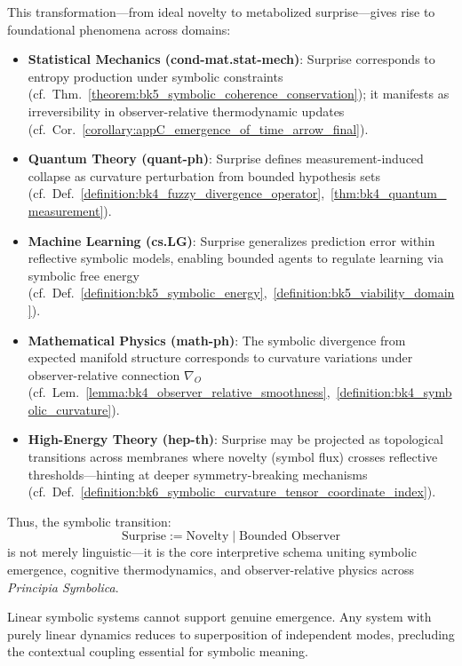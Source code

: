 \begin{tcolorbox}[colback=blue!5!white, colframe=blue!75!black, title=From Novelty to Surprise: The Operational Definition for Observer-Framed Divergence]
This transformation—from ideal novelty to metabolized surprise—gives rise to foundational phenomena across domains:
\begin{itemize}
    \item \textbf{Statistical Mechanics (cond-mat.stat-mech)}: Surprise corresponds to entropy production under symbolic constraints (cf.~Thm.~\ref{theorem:bk5_symbolic_coherence_conservation}); it manifests as irreversibility in observer-relative thermodynamic updates (cf.~Cor.~\ref{corollary:appC_emergence_of_time_arrow_final}).
    \item \textbf{Quantum Theory (quant-ph)}: Surprise defines measurement-induced collapse as curvature perturbation from bounded hypothesis sets (cf.~Def.~\ref{definition:bk4_fuzzy_divergence_operator},~\ref{thm:bk4_quantum_measurement}).
    \item \textbf{Machine Learning (cs.LG)}: Surprise generalizes prediction error within reflective symbolic models, enabling bounded agents to regulate learning via symbolic free energy (cf.~Def.~\ref{definition:bk5_symbolic_energy},~\ref{definition:bk5_viability_domain}).
    \item \textbf{Mathematical Physics (math-ph)}: The symbolic divergence from expected manifold structure corresponds to curvature variations under observer-relative connection $\nabla_O$ (cf.~Lem.~\ref{lemma:bk4_observer_relative_smoothness},~\ref{definition:bk4_symbolic_curvature}).
    \item \textbf{High-Energy Theory (hep-th)}: Surprise may be projected as topological transitions across membranes where novelty (symbol flux) crosses reflective thresholds—hinting at deeper symmetry-breaking mechanisms (cf.~Def.~\ref{definition:bk6_symbolic_curvature_tensor_coordinate_index}).
\end{itemize}

Thus, the symbolic transition:
\[
\boxed{\text{Surprise} := \text{Novelty} \mid \text{Bounded Observer}}
\]
is not merely linguistic—it is the core interpretive schema uniting symbolic emergence, cognitive thermodynamics, and observer-relative physics across \textit{Principia Symbolica}.
\end{tcolorbox}



\begin{corollary}
\label{corollary:bk1_linear_insufficiency}
Linear symbolic systems cannot support genuine emergence. Any system with purely linear dynamics reduces to superposition of independent modes, precluding the contextual coupling essential for symbolic meaning.
\end{corollary}

